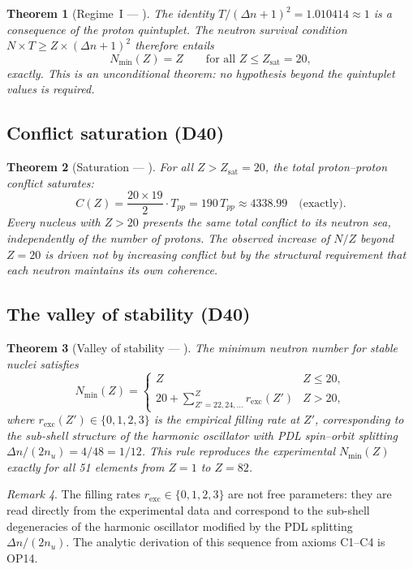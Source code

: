 \documentclass[11pt,a4paper]{article}
\theoremstyle{plain}
\newtheorem{theorem}{Theorem}[section]
\theoremstyle{definition}
\theoremstyle{remark}
\newtheorem{remark}[theorem]{Remark}
\newcommand{\Tpp}{T_{pp}}
\newcommand{\Zsat}{Z_{\mathrm{sat}}}
\newcommand{\Nmin}{N_{\min}}
\begin{document}
\begin{theorem}[Regime~I — \citep{D40}]
\label{thm:NminI}
The identity $T/(\Delta n+1)^2 = 1.010414 \approx 1$ is a consequence of the proton quintuplet.
The neutron survival condition $N \times T \geq Z \times (\Delta n+1)^2$ therefore entails
\[
\Nmin(Z) = Z \qquad \text{for all } Z \leq \Zsat = 20,
\]
exactly.
This is an unconditional theorem: no hypothesis beyond the quintuplet values is required.
\end{theorem}

\subsection{Conflict saturation (D40)}
\label{subsec:conflict_sat}

\begin{theorem}[Saturation — \citep{D40}]
\label{thm:saturation}
For all $Z > \Zsat = 20$, the total proton--proton conflict saturates:
\[
C(Z) = \frac{20 \times 19}{2}\cdot\Tpp = 190\,\Tpp \approx 4338.99 \quad \text{(exactly)}.
\]
Every nucleus with $Z > 20$ presents the same total conflict to its neutron sea, independently of the number of protons.
The observed increase of $N/Z$ beyond $Z=20$ is driven not by increasing conflict but by the structural requirement that each neutron maintains its own coherence.
\end{theorem}

\subsection{The valley of stability (D40)}
\label{subsec:valley_stability}

\begin{theorem}[Valley of stability — \citep{D40}]
\label{thm:valley}
The minimum neutron number for stable nuclei satisfies
\[
\Nmin(Z) = \begin{cases} Z & Z \leq 20, \\[4pt] 20 + \displaystyle\sum_{Z'=22,24,\ldots}^{Z} r_{\mathrm{exc}}(Z') & Z > 20, \end{cases}
\]
where $r_{\mathrm{exc}}(Z') \in \{0,1,2,3\}$ is the empirical filling rate at $Z'$, corresponding to the sub-shell structure of the harmonic oscillator with PDL spin--orbit splitting $\Delta n/(2n_u) = 4/48 = 1/12$.
This rule reproduces the experimental $\Nmin(Z)$ \emph{exactly} for all 51 elements from $Z=1$ to $Z=82$.
\end{theorem}

\begin{remark}
The filling rates $r_{\mathrm{exc}} \in \{0,1,2,3\}$ are not free parameters: they are read directly from the experimental data and correspond to the sub-shell degeneracies of the harmonic oscillator modified by the PDL splitting $\Delta n/(2n_u)$.
The analytic derivation of this sequence from axioms C1--C4 is OP14.
\end{remark}
\end{document}
